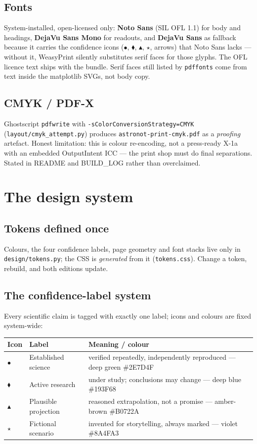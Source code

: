 \documentclass[11pt,a4paper]{article}
\newcommand{\code}[1]{\texttt{#1}}
\begin{document}
\subsection{Fonts}
System-installed, open-licensed only: \textbf{Noto Sans} (SIL OFL 1.1) for
body and headings, \textbf{DejaVu Sans Mono} for readouts, and
\textbf{DejaVu Sans} as fallback because it carries the confidence icons
($\bullet$, $\blacklozenge$, $\blacktriangle$, $\star$, arrows) that Noto Sans
lacks --- without it, WeasyPrint silently substitutes serif faces for those
glyphs. The OFL licence text ships with the bundle. Serif faces still listed
by \code{pdffonts} come from text inside the matplotlib SVGs, not body copy.

\subsection{CMYK / PDF-X}
Ghostscript \code{pdfwrite} with \code{-sColorConversionStrategy=CMYK}
(\code{layout/cmyk\_attempt.py}) produces \code{astronot-print-cmyk.pdf} as a
\emph{proofing} artefact. Honest limitation: this is colour re-encoding, not a
press-ready X-1a with an embedded OutputIntent ICC --- the print shop must do
final separations. Stated in README and BUILD\_LOG rather than overclaimed.

\section{The design system}

\subsection{Tokens defined once}
Colours, the four confidence labels, page geometry and font stacks live only
in \code{design/tokens.py}; the CSS is \emph{generated} from it
(\code{tokens.css}). Change a token, rebuild, and both editions update.

\subsection{The confidence-label system}
Every scientific claim is tagged with exactly one label; icons and colours are
fixed system-wide:

\begin{longtable}{p{10mm}p{44mm}p{92mm}}
\textbf{Icon} & \textbf{Label} & \textbf{Meaning / colour}\\
\endhead
$\bullet$ & Established science & verified repeatedly, independently
reproduced --- deep green \#2E7D4F\\
$\blacklozenge$ & Active research & under study; conclusions may change ---
deep blue \#193F68\\
$\blacktriangle$ & Plausible projection & reasoned extrapolation, not a
promise --- amber-brown \#B0722A\\
$\star$ & Fictional scenario & invented for storytelling, always marked ---
violet \#8A4FA3\\
\end{longtable}
\end{document}
